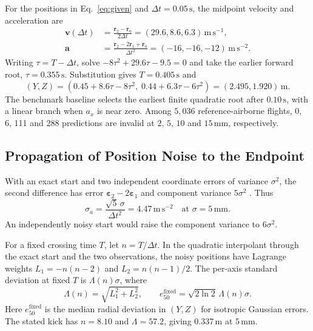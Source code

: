 \documentclass[11pt,a4paper]{article}
\begin{document}
For the positions in Eq.~\eqref{eq:given} and $\Delta t=0.05\,\mathrm{s}$, the midpoint velocity and acceleration are
\begin{align}
  \mathbf v(\Delta t)&=\frac{\mathbf r_2-\mathbf r_0}{2\Delta t}=(29.6,8.6,6.3)\,\mathrm{m\,s^{-1}},\label{eq:baseline}\\
  \mathbf a&=\frac{\mathbf r_2-2\mathbf r_1+\mathbf r_0}{\Delta t^2}=(-16,-16,-12)\,\mathrm{m\,s^{-2}}.
\end{align}
Writing $\tau=T-\Delta t$, solve $-8\tau^2+29.6\tau-9.5=0$ and take the earlier forward root, $\tau=0.355\,\mathrm{s}$. Substitution gives $T=0.405\,\mathrm{s}$ and
\begin{equation}
  (Y,Z)=(0.45+8.6\tau-8\tau^2,\;0.44+6.3\tau-6\tau^2)=(2.495,1.920)\,\mathrm{m}.
  \label{eq:baselineYZ}
\end{equation}
The benchmark baseline selects the earliest finite quadratic root after $0.10\,\mathrm{s}$, with a linear branch when $a_x$ is near zero. Among $5{,}036$ reference-airborne flights, 0, 6, 111 and 288 predictions are invalid at $2$, $5$, $10$ and $15\,\mathrm{mm}$, respectively.

\subsection{Propagation of Position Noise to the Endpoint}

With an exact start and two independent coordinate errors of variance $\sigma^2$, the second difference has error $\boldsymbol\varepsilon_2-2\boldsymbol\varepsilon_1$ and component variance $5\sigma^2$ \cite{gum2008}. Thus
\begin{equation}
  \sigma_a=\frac{\sqrt{5}\,\sigma}{\Delta t^2}=4.47\,\mathrm{m\,s^{-2}}
  \quad\text{at }\sigma=5\,\mathrm{mm}.
  \label{eq:sigmaa}
\end{equation}
An independently noisy start would raise the component variance to $6\sigma^2$.

For a fixed crossing time $T$, let $n=T/\Delta t$. In the quadratic interpolant through the exact start and the two observations, the noisy positions have Lagrange weights $L_1=-n(n-2)$ and $L_2=n(n-1)/2$. The per-axis standard deviation at fixed $T$ is $\Lambda(n)\sigma$, where
\begin{equation}
  \Lambda(n)=\sqrt{L_1^2+L_2^2},\qquad
  e_{50}^{\mathrm{fixed}}=\sqrt{2\ln 2}\,\Lambda(n)\sigma .
  \label{eq:noise-amplification}
\end{equation}
Here $e_{50}^{\mathrm{fixed}}$ is the median radial deviation in $(Y,Z)$ for isotropic Gaussian errors. The stated kick has $n=8.10$ and $\Lambda=57.2$, giving $0.337\,\mathrm{m}$ at $5\,\mathrm{mm}$.
\end{document}
